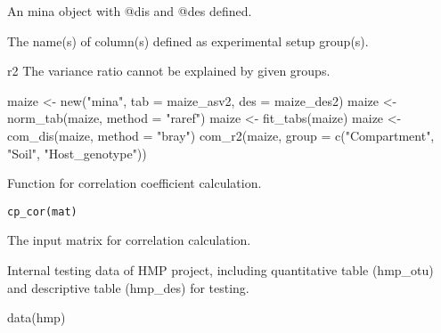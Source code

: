 \documentclass[a4paper]{book}
\begin{document}
%
\begin{Arguments}
\begin{ldescription}
\item[\code{x}] An mina object with @dis and @des defined.

\item[\code{group}] The name(s) of column(s) defined as experimental setup group(s).
\end{ldescription}
\end{Arguments}
%
\begin{Value}
r2 The variance ratio cannot be explained by given groups.
\end{Value}
%
\begin{Examples}
\begin{ExampleCode}
maize <- new("mina", tab = maize_asv2, des = maize_des2)
maize <- norm_tab(maize, method = "raref")
maize <- fit_tabs(maize)
maize <- com_dis(maize, method = "bray")
com_r2(maize, group = c("Compartment", "Soil", "Host_genotype"))
\end{ExampleCode}
\end{Examples}
%
\begin{Description}\relax
Function for correlation coefficient calculation.
\end{Description}
%
\begin{Usage}
\begin{verbatim}
cp_cor(mat)
\end{verbatim}
\end{Usage}
%
\begin{Arguments}
\begin{ldescription}
\item[\code{mat}] The input matrix for correlation calculation.
\end{ldescription}
\end{Arguments}
%
\begin{Description}\relax
Internal testing data of HMP project, including quantitative table (hmp\_otu)
and descriptive table (hmp\_des) for testing.
\end{Description}
%
\begin{Examples}
\begin{ExampleCode}
data(hmp)
\end{ExampleCode}
\end{Examples}
\end{document}
